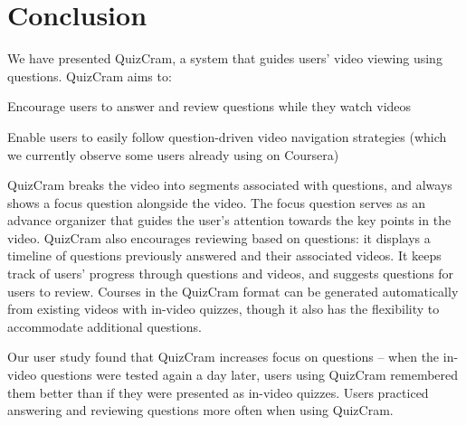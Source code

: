 \documentclass{sigchi}
\begin{document}
\section{Conclusion}
We have presented QuizCram, a system that guides users' video viewing using questions. QuizCram aims to:

\begin{compactenum}
\item Encourage users to answer and review questions while they watch videos
\item Enable users to easily follow question-driven video navigation strategies (which we currently observe some users already using on Coursera)
\end{compactenum}

QuizCram breaks the video into segments associated with questions, and always shows a focus question alongside the video. The focus question serves as an advance organizer that guides the user's attention towards the key points in the video. QuizCram also encourages reviewing based on questions: it displays a timeline of questions previously answered and their associated videos. It keeps track of users' progress through questions and videos, and suggests questions for users to review. Courses in the QuizCram format can be generated automatically from existing videos with in-video quizzes, though it also has the flexibility to accommodate additional questions.


Our user study found that QuizCram increases focus on questions -- when the in-video questions were tested again a day later, users using QuizCram remembered them better than if they were presented as in-video quizzes. Users practiced answering and reviewing questions more often when using QuizCram. %
\end{document}
